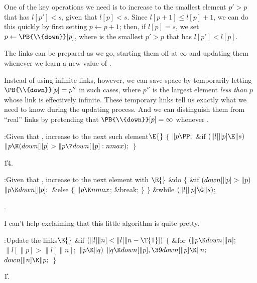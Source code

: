 One of the key operations we need is to increase  to the smallest
element $p'>p$ that has $l[p']<s$, given that $l[p]<s$. Since
$l[p+1]\le l[p]+1$, we can do this quickly by first setting $p\gets p+1$;
then, if $l[p]=s$, we set $p\gets\PB{\\{down}}[p]$, where  is
the
smallest $p'>p$ that has $l[p']<l[p]$.

The links  can be prepared as we go, starting them off at $%
\infty$
and updating them whenever we learn a new value of .

Instead of using infinite links, however, we can save space by
temporarily letting $\PB{\\{down}}[p]=p''$ in such cases, where $p''$ is the
largest element {\it less than\/} $p$ whose  link is effectively
infinite. These temporary links tell us exactly what we need to know during
the updating process. And we can distinguish them from ``real'' 
links by pretending that $\PB{\\{down}}[p]=\infty$ whenever .

\Y\B\4:Given that , increase  to the next such
element\X${}\E{}$\6
${}\{{}$\1\6
${}\|p\PP;{}$\6
\&{if} ${}(\|l[\|p]\E\|s){}$\1\5
${}\|p\K(\\{down}[\|p]>\|p\?\\{down}[\|p]:\\{nmax});{}$\2\6
\4${}\}{}$\2\par
\U14.\fi

\B{}:Given that , increase  to the next
element with \X${}\E{}$\6
\&{do}\5
${}\{{}$\1\6
\&{if} ${}(\\{down}[\|p]>\|p){}$\1\5
${}\|p\K\\{down}[\|p];{}$\2\6
\&{else}\5
${}\{{}$\1\6
${}\|p\K\\{nmax}{}$;\5
\&{break};\6
\4${}\}{}$\2\6
\4${}\}{}$\5
\2\5
\&{while} ${}(\|l[\|p]\G\|s){}$;\par
{}.\fi

I can't help exclaiming that this little algorithm is quite pretty.

\Y\B\4:Update the  links\X${}\E{}$\6
\&{if} ${}(\|l[\|n]<\|l[\|n-\T{1}]){}$\5
${}\{{}$\1\6
\&{for} ${}(\|p\K\\{down}[\|n];{}$ ${}\|l[\|p]>\|l[\|n];{}$ ${}\|p\K\|q){}$\1\5
${}\|q\K\\{down}[\|p],\39\\{down}[\|p]\K\|n;{}$\2\6
${}\\{down}[\|n]\K\|p;{}$\6
\4${}\}{}$\2\par
\U1.\fi

